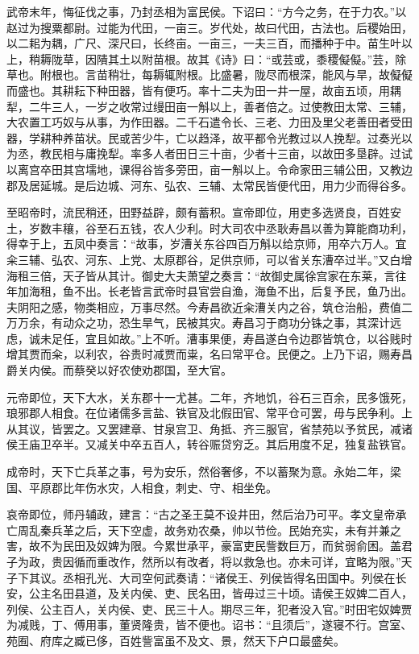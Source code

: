 \documentclass[12pt,UTF8]{ctexbook}
\begin{document}
武帝末年，悔征伐之事，乃封丞相为富民侯。下诏曰：“方今之务，在于力农。”以赵过为搜粟都尉。过能为代田，一亩三。岁代处，故曰代田，古法也。后稷始田，以二耜为耦，广尺、深尺曰，长终亩。一亩三，一夫三百，而播种于中。苗生叶以上，稍耨陇草，因隤其土以附苗根。故其《诗》曰：“或芸或，黍稷儗儗。”芸，除草也。附根也。言苗稍壮，每耨辄附根。比盛暑，陇尽而根深，能风与旱，故儗儗而盛也。其耕耘下种田器，皆有便巧。率十二夫为田一井一屋，故亩五顷，用耦犁，二牛三人，一岁之收常过缦田亩一斛以上，善者倍之。过使教田太常、三辅，大农置工巧奴与从事，为作田器。二千石遣令长、三老、力田及里父老善田者受田器，学耕种养苗状。民或苦少牛，亡以趋泽，故平都令光教过以人挽犁。过奏光以为丞，教民相与庸挽犁。率多人者田日三十亩，少者十三亩，以故田多垦辟。过试以离宫卒田其宫壖地，课得谷皆多旁田，亩一斛以上。令命家田三辅公田，又教边郡及居延城。是后边城、河东、弘农、三辅、太常民皆便代田，用力少而得谷多。



至昭帝时，流民稍还，田野益辟，颇有蓄积。宣帝即位，用吏多选贤良，百姓安土，岁数丰穰，谷至石五钱，农人少利。时大司农中丞耿寿昌以善为算能商功利，得幸于上，五凤中奏言：“故事，岁漕关东谷四百万斛以给京师，用卒六万人。宜籴三辅、弘农、河东、上党、太原郡谷，足供京师，可以省关东漕卒过半。”又白增海租三倍，天子皆从其计。御史大夫萧望之奏言：“故御史属徐宫家在东莱，言往年加海租，鱼不出。长老皆言武帝时县官尝自渔，海鱼不出，后复予民，鱼乃出。夫阴阳之感，物类相应，万事尽然。今寿昌欲近籴漕关内之谷，筑仓治船，费值二万万余，有动众之功，恐生旱气，民被其灾。寿昌习于商功分铢之事，其深计远虑，诚未足任，宜且如故。”上不听。漕事果便，寿昌遂白令边郡皆筑仓，以谷贱时增其贾而籴，以利农，谷贵时减贾而粜，名曰常平仓。民便之。上乃下诏，赐寿昌爵关内侯。而蔡癸以好农使劝郡国，至大官。



元帝即位，天下大水，关东郡十一尤甚。二年，齐地饥，谷石三百余，民多饿死，琅邪郡人相食。在位诸儒多言盐、铁官及北假田官、常平仓可罢，毋与民争利。上从其议，皆罢之。又罢建章、甘泉宫卫、角抵、齐三服官，省禁苑以予贫民，减诸侯王庙卫卒半。又减关中卒五百人，转谷赈贷穷乏。其后用度不足，独复盐铁官。



成帝时，天下亡兵革之事，号为安乐，然俗奢侈，不以蓄聚为意。永始二年，梁国、平原郡比年伤水灾，人相食，刺史、守、相坐免。



哀帝即位，师丹辅政，建言：“古之圣王莫不设井田，然后治乃可平。孝文皇帝承亡周乱秦兵革之后，天下空虚，故务劝农桑，帅以节俭。民始充实，未有并兼之害，故不为民田及奴婢为限。今累世承平，豪富吏民訾数巨万，而贫弱俞困。盖君子为政，贵因循而重改作，然所以有改者，将以救急也。亦未可详，宜略为限。”天子下其议。丞相孔光、大司空何武奏请：“诸侯王、列侯皆得名田国中。列侯在长安，公主名田县道，及关内侯、吏、民名田，皆毋过三十顷。请侯王奴婢二百人，列侯、公主百人，关内侯、吏、民三十人。期尽三年，犯者没入官。”时田宅奴婢贾为减贱，丁、傅用事，董贤隆贵，皆不便也。诏书：“且须后”，遂寝不行。宫室、苑囿、府库之臧已侈，百姓訾富虽不及文、景，然天下户口最盛矣。
\end{document}
